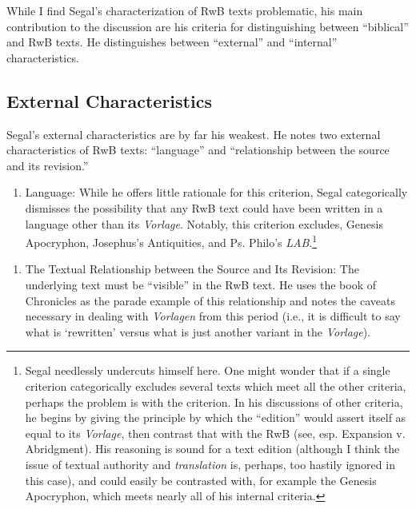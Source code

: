 While I find Segal's characterization of RwB texts problematic, his main
contribution to the discussion are his criteria for distinguishing
between ``biblical'' and RwB texts. He distinguishes between
``external'' and ``internal'' characteristics.

\subsection{External Characteristics}\label{external-characteristics}

Segal's external characteristics are by far his weakest. He notes two
external characteristics of RwB texts: ``language'' and ``relationship
between the source and its revision.''

\begin{enumerate}
\def\labelenumi{\arabic{enumi}.}
\tightlist
\item
  Language: While he offers little rationale for this criterion, Segal
  categorically dismisses the possibility that any RwB text could have
  been written in a language other than its \emph{Vorlage}. Notably,
  this criterion excludes, Genesis Apocryphon, Josephus's Antiquities,
  and Ps. Philo's \emph{LAB}.\footnote{Segal needlessly undercuts
    himself here. One might wonder that if a single criterion
    categorically excludes several texts which meet all the other
    criteria, perhaps the problem is with the criterion. In his
    discussions of other criteria, he begins by giving the principle by
    which the ``edition'' would assert itself as equal to its
    \emph{Vorlage}, then contrast that with the RwB (see, esp. Expansion
    v. Abridgment). His reasoning is sound for a text edition (although
    I think the issue of textual authority and \emph{translation} is,
    perhaps, too hastily ignored in this case), and could easily be
    contrasted with, for example the Genesis Apocryphon, which meets
    nearly all of his internal criteria.}
\end{enumerate}

\begin{enumerate}
\def\labelenumi{\arabic{enumi}.}
\setcounter{enumi}{1}
\tightlist
\item
  The Textual Relationship between the Source and Its Revision: The
  underlying text must be ``visible'' in the RwB text. He uses the book
  of Chronicles as the parade example of this relationship and notes the
  caveats necessary in dealing with \emph{Vorlagen} from this period
  (i.e., it is difficult to say what is `rewritten' versus what is just
  another variant in the \emph{Vorlage}).
\end{enumerate}

